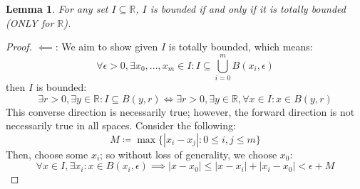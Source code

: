 \documentclass[10pt,letterpaper]{article} %
\newtheorem{lem}{Lemma}[section]
\begin{document}
\begin{lem}
For any set $I \subseteq \mathbb{R}$, $I$ is bounded if and only if it is totally bounded (ONLY for $\mathbb{R}$).
\end{lem}
\begin{proof}
$\impliedby$: 
We aim to show given $I$ is totally bounded, which means:
\begin{equation*}
\forall \epsilon > 0, \exists x_0, ..., x_m \in I: I \subseteq \bigcup_{i=0}^{m}B(x_i, \epsilon)
\end{equation*}
then $I$ is bounded:
\begin{equation*}
\exists r > 0, \exists y \in \mathbb{R}: I \subseteq B(y, r) \iff \exists r > 0, \exists y \in \mathbb{R}, \forall x \in I: x \in B(y, r)
\end{equation*}
This converse direction is necessarily true; however, the forward direction is not necessarily true in all spaces. Consider the following:
\begin{equation*}
M \coloneq \max\{|x_i - x_j| : 0 \leqslant i, j \leqslant m\}
\end{equation*}
Then, choose some $x_i$; so without loss of generality, we choose $x_0$:
\begin{equation*}
\forall x \in I, \exists x_i: x \in B(x_i, \epsilon) \implies |x-x_0| \leqslant |x-x_i| + |x_i - x_0| < \epsilon + M
\end{equation*}


\end{proof}
\end{document}
